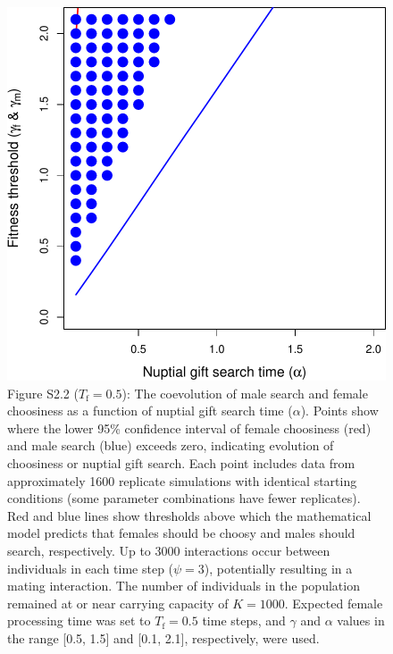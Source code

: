 \documentclass[
]{article}
\begin{document}
\begin{figure}
\centering
\includegraphics{SI_files/figure-latex/unnamed-chunk-3-1.pdf}
\caption{Figure S2.2 (\(T_{\mathrm{f}} = 0.5\)): The coevolution of male
search and female choosiness as a function of nuptial gift search time
(\(\alpha\)). Points show where the lower 95\% confidence interval of
female choosiness (red) and male search (blue) exceeds zero, indicating
evolution of choosiness or nuptial gift search. Each point includes data
from approximately 1600 replicate simulations with identical starting
conditions (some parameter combinations have fewer replicates). Red and
blue lines show thresholds above which the mathematical model predicts
that females should be choosy and males should search, respectively. Up
to 3000 interactions occur between individuals in each time step
(\(\psi = 3\)), potentially resulting in a mating interaction. The
number of individuals in the population remained at or near carrying
capacity of \(K = 1000\). Expected female processing time was set to
\(T_{\mathrm{f}}=0.5\) time steps, and \(\gamma\) and \(\alpha\) values
in the range {[}0.5, 1.5{]} and {[}0.1, 2.1{]}, respectively, were
used.}
\end{figure}

\captionsetup{labelformat=default}

\clearpage
\end{document}
